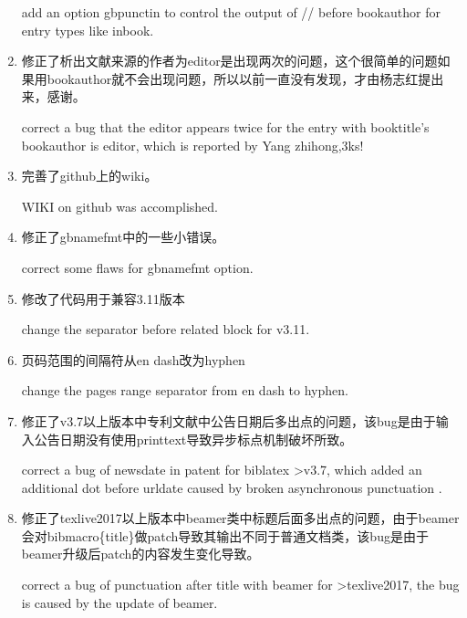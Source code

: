 \begin{enumerate}
add an option gbpunctin to control the output of // before bookauthor for entry types like inbook.

\item 修正了析出文献来源的作者为editor是出现两次的问题，这个很简单的问题如果用bookauthor就不会出现问题，所以以前一直没有发现，才由杨志红提出来，感谢。

correct a bug that the editor appears twice for the entry with booktitle's bookauthor is editor, which is reported by Yang zhihong,3ks!

\item 完善了github上的wiki。

WIKI on github was accomplished.

\item 修正了gbnamefmt中的一些小错误。

correct some flaws for gbnamefmt option.

\item 修改了代码用于兼容3.11版本

change the separator before related block for v3.11.

\item 页码范围的间隔符从en dash改为hyphen

change the pages range separator from en dash to hyphen.
	
\item 修正了v3.7以上版本中专利文献中公告日期后多出点的问题，该bug是由于输入公告日期没有使用printtext导致异步标点机制破坏所致。

correct a bug of newsdate in patent for biblatex >v3.7, which added an additional dot before urldate caused by broken asynchronous punctuation .

\item 修正了texlive2017以上版本中beamer类中标题后面多出点的问题，由于beamer会对bibmacro\{title\}做patch导致其输出不同于普通文档类，该bug是由于beamer升级后patch的内容发生变化导致。

correct a bug of punctuation after title with beamer for >texlive2017, the bug is caused by the update of beamer.
\end{enumerate}

